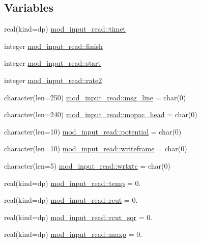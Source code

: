 \subsection*{Variables}
\begin{DoxyCompactItemize}
\item 
real(kind=dp) \hyperlink{namespacemod__input__read_a5ccab548b1c0f51bdd20cc9251e4dedb}{mod\+\_\+input\+\_\+read\+::timet}
\item 
integer \hyperlink{namespacemod__input__read_af49668c97f27e5589794e545c5be5a22}{mod\+\_\+input\+\_\+read\+::finish}
\item 
integer \hyperlink{namespacemod__input__read_a1fe425b57ec0b776789d69284fa29955}{mod\+\_\+input\+\_\+read\+::start}
\item 
integer \hyperlink{namespacemod__input__read_a55525057629121499c3d3fb26c7bf282}{mod\+\_\+input\+\_\+read\+::rate2}
\item 
character(len=250) \hyperlink{namespacemod__input__read_a2aa6f72008491094c0c96753d8d63d2e}{mod\+\_\+input\+\_\+read\+::msg\+\_\+line} = char(0)
\item 
character(len=240) \hyperlink{namespacemod__input__read_a21db2c7c0ef283f45a6893ca2bf9a34a}{mod\+\_\+input\+\_\+read\+::mopac\+\_\+head} = char(0)
\item 
character(len=10) \hyperlink{namespacemod__input__read_af992e8c0badb490ee9f1d75568de6372}{mod\+\_\+input\+\_\+read\+::potential} = char(0)
\item 
character(len=10) \hyperlink{namespacemod__input__read_a7327a05a4121e6b530adab45fdaa5d19}{mod\+\_\+input\+\_\+read\+::writeframe} = char(0)
\item 
character(len=5) \hyperlink{namespacemod__input__read_a27a1649717d0aa5463782f51c29102f4}{mod\+\_\+input\+\_\+read\+::wrtxtc} = char(0)
\item 
real(kind=dp) \hyperlink{namespacemod__input__read_a41af319bbc9c366863fee70f87f590a0}{mod\+\_\+input\+\_\+read\+::temp} = 0.
\item 
real(kind=dp) \hyperlink{namespacemod__input__read_ad16f7026be229b0b283174a293fe570e}{mod\+\_\+input\+\_\+read\+::rcut} = 0.
\item 
real(kind=dp) \hyperlink{namespacemod__input__read_a4c4705d35961d02b4275f73e44077819}{mod\+\_\+input\+\_\+read\+::rcut\+\_\+sqr} = 0.
\item 
real(kind=dp) \hyperlink{namespacemod__input__read_a52849ceaebc993cf06d473c80bdf92ac}{mod\+\_\+input\+\_\+read\+::maxp} = 0.
\item 

\end{DoxyCompactItemize}
